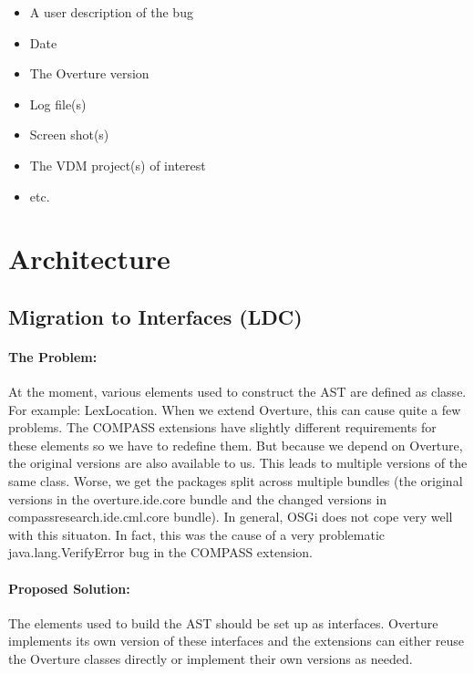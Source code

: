 \documentclass[11pt]{overturerep} \usepackage{t1enc,times,a4,t1enc}
\begin{document}
\begin{itemize} 
    \item A user description of the bug 
    \item Date 
    \item The Overture version 
    \item Log file(s) 
    \item Screen shot(s) 
    \item The VDM project(s) of interest 
    \item etc.  
\end{itemize}






\chapter{Architecture}


\section{Migration to Interfaces (LDC) } \label{sec:interfacemig}

\subsubsection{The Problem:}

At the moment, various elements used to construct the AST are defined as
classe. For example: \textsf{LexLocation}. When we extend Overture, this
can cause quite a few problems. The COMPASS extensions have slightly
different requirements for these elements so we have to redefine them. But
because we depend on Overture, the original versions are also available to
us. This leads to multiple versions of the same class. Worse, we get the
packages split across multiple bundles (the original versions in the
overture.ide.core bundle and the changed versions in
compassresearch.ide.cml.core bundle). In general, OSGi does not cope very
well with this situaton. In fact, this was the cause of a very problematic
\textsf{java.lang.VerifyError} bug in the COMPASS extension.




\subsubsection{Proposed Solution:}

The elements used to build the AST should be set up as interfaces. Overture
implements its own version of these interfaces and the extensions can
either reuse the Overture classes directly or implement their own versions
as needed.
\end{document}
